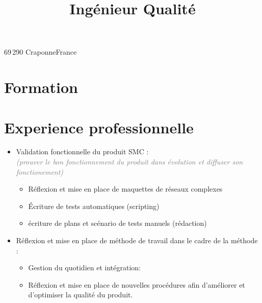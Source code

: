 

\title{Ingénieur Qualité} 
\address{57, place des mimosas}{69\,290 Craponne}{France}


\makecvtitle
\section{Formation}
\section{Experience professionnelle}
		{
			\begin{itemize}
			\item Validation fonctionnelle du produit SMC :\\
			\tabto{0.5cm} \textcolor{gray}{\emph{(prouver le bon fonctionnement du produit dans évolution et diffuser son fonctionement)}}
				\begin{itemize}
				\item Réflexion et mise en place de maquettes de réseaux complexes
				\item Écriture de tests automatiques (scripting)
				\item écriture de plans et scénario de tests manuels (rédaction)
				\end{itemize}
			\end{itemize}
			\begin{itemize}
			\item Réflexion et mise en place de méthode de travail dans le cadre de la méthode :
				\begin{itemize}
				\item Gestion du quotidien et intégration: 
				\item Réflexion et mise en place de nouvelles procédures afin d'améliorer et d'optimiser la qualité du produit.
				\end{itemize}
			\end{itemize}
		}
